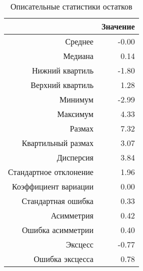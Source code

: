 \begin{table}[ht]
\centering
\begin{tabular}{rr}
  \hline
 & Значение \\ 
  \hline
Среднее & -0.00 \\ 
  Медиана & 0.14 \\ 
  Нижний квартиль & -1.80 \\ 
  Верхний квартиль & 1.28 \\ 
  Минимум & -2.99 \\ 
  Максимум & 4.33 \\ 
  Размах & 7.32 \\ 
  Квартильный размах & 3.07 \\ 
  Дисперсия & 3.84 \\ 
  Стандартное отклонение & 1.96 \\ 
  Коэффициент вариации & 0.00 \\ 
  Стандартная ошибка & 0.33 \\ 
  Асимметрия & 0.42 \\ 
  Ошибка асимметрии & 0.40 \\ 
  Эксцесс & -0.77 \\ 
  Ошибка эксцесса & 0.78 \\ 
   \hline
\end{tabular}
\caption{Описательные статистики остатков} 
\label{table:residuals_dstats}
\end{table}

